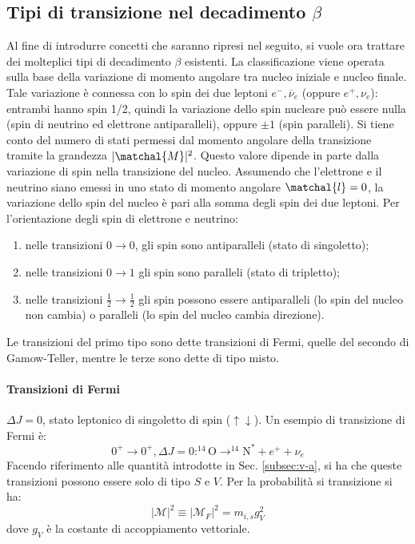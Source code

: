 \documentclass{subnucbo}
\begin{document}
\subsection{Tipi di transizione nel decadimento $\beta$}
Al fine di introdurre concetti che saranno ripresi nel seguito, si vuole ora trattare dei molteplici tipi di decadimento $\beta$ esistenti. La classificazione viene operata sulla base della variazione di momento angolare tra nucleo iniziale e nucleo finale. Tale variazione è connessa con lo spin dei due leptoni $e ^ { - } , \overline { \nu } _ { e }$ (oppure $e^{+}, \nu_{e}$): entrambi hanno spin 1/2, quindi la variazione dello spin nucleare può essere nulla (spin di neutrino ed elettrone antiparalleli), oppure $\pm1$ (spin paralleli). Si tiene conto del numero di stati permessi dal momento angolare della transizione tramite la grandezza $|\matchal{M}|^{2}$. Questo valore dipende in parte dalla variazione di spin nella transizione del nucleo. Assumendo che l'elettrone e il neutrino siano emessi in uno stato di momento angolare $\matchal{l}=0$, la variazione dello spin del nucleo è pari alla somma degli spin dei due leptoni. Per l'orientazione degli spin di elettrone e neutrino:
\begin{enumerate}
        \item nelle transizioni $0 \rightarrow 0$, gli spin sono antiparalleli (stato di singoletto);
        \item nelle transizioni $0 \rightarrow 1$ gli spin sono paralleli (stato di tripletto);
        \item nelle transizioni $\frac{1}{2} \rightarrow \frac{1}{2}$ gli spin possono essere antiparalleli (lo spin del nucleo non cambia) o paralleli (lo spin del nucleo cambia direzione).
\end{enumerate}
Le transizioni del primo tipo sono dette transizioni di Fermi, quelle del secondo di Gamow-Teller, mentre le terze sono dette di tipo misto.
\paragraph{Transizioni di Fermi} $\Delta J=0$, stato leptonico di singoletto di spin ($\uparrow\downarrow$). Un esempio di transizione di Fermi è:
\begin{equation}
        0 ^ { + } \rightarrow 0 ^ { + } , \Delta J = 0 : ^ { 14 } \mathrm { O } \rightarrow ^ { 14 } \mathrm { N } ^ { * } + e ^ { + } + \nu _ { e }
        \label{eq:fermi_ex}
\end{equation}
Facendo riferimento alle quantità introdotte in Sec. \ref{subsec:v-a}, si ha che queste transizioni possono essere solo di tipo $S$ e $V$. Per la probabilità si transizione si ha:
\begin{equation}
        | \mathcal { M } | ^ { 2 } \equiv \left| \mathcal { M } _ { F } \right| ^ { 2 } = m _ { i , s } g _ { V } ^ { 2 }
        \label{eq:m_fermi}
\end{equation}
dove $g_{V}$ è la costante di accoppiamento vettoriale.
\end{document}
